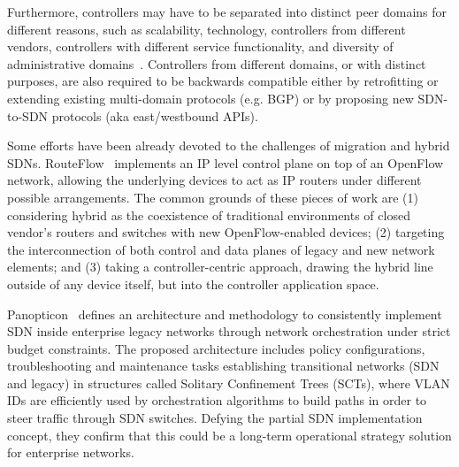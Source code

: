 Furthermore, controllers may have to be separated into distinct peer domains for different reasons, such as scalability, technology, controllers from different vendors, controllers with different service functionality, and diversity of administrative domains~\cite{ONF2014SDNarch}.
Controllers from different domains, or with distinct purposes, are also required to be backwards compatible either by retrofitting or extending existing multi-domain protocols (e.g. BGP) or by proposing new SDN-to-SDN protocols (aka east/westbound APIs).

Some efforts have been already devoted to the challenges of migration and hybrid SDNs. RouteFlow~\cite{rothenberg2012-1} implements an IP level control plane on top of an OpenFlow 
network, allowing the underlying devices to act as IP routers under different possible arrangements. 
The common 
grounds of these pieces of work are (1) considering hybrid as the coexistence of traditional environments of 
closed vendor's routers and switches with new OpenFlow-enabled devices; (2) targeting the interconnection of 
both control and data planes of legacy and new network elements; and (3) taking a controller-centric approach, 
drawing the hybrid line outside of any device itself, but into the controller application space.

Panopticon~\cite{levin2014} defines an architecture and methodology to consistently implement 
SDN inside enterprise legacy networks through network orchestration under strict budget constraints. The proposed 
architecture includes policy configurations, troubleshooting and maintenance tasks establishing transitional networks 
(SDN and legacy) in structures called Solitary Confinement Trees (SCTs), where VLAN IDs are efficiently used by 
orchestration algorithms to build paths in order to steer traffic through SDN switches. Defying the partial SDN 
implementation concept, they confirm that this could be a long-term operational strategy solution for enterprise 
networks.

